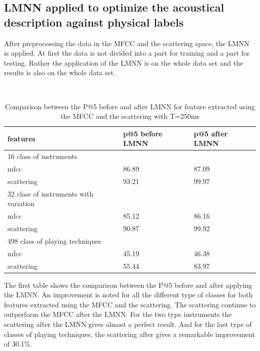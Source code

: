 \documentclass[hidelinks,12pt]{report}
\begin{document}
\subsection{LMNN applied to optimize the acoustical description against physical labels}
After preprocessing the data in the MFCC and the scattering space, the LMNN is applied. At first the data is not divided into a part for training and a part for testing. Rather the application of the LMNN is on the whole data set and the results is also on the whole data set.
\begin{table} [H]
\begin{center} 
\ 
 \setlength{\tabcolsep}{.16667em} 
\begin{tabular}{|l|l|l|} 
\hline
features & p@5 before LMNN & p@5 after LMNN \\ 
\hline 
16 class of instruments \\ 
\hline
mfcc & 86.89& 87.09  \\ 
scattering & 93.21 & 99.97  \\ 

\hline 
32 class of instruments with variation \\ 
\hline
mfcc & 85.12 & 86.16  \\ 
scattering & 90.87 & 99.92  \\ 
\hline 
498 class of playing techniques \\ 
\hline
mfcc &  45.19 & 46.38  \\ 
scattering & 55.44 & 83.97  \\ 
\hline
\end{tabular} 
\end{center} 
\caption{Comparison between the P@5 before and after LMNN for feature extracted using the MFCC and the scattering with T=250ms} 
\label{you} 
\end{table}

The first table shows the comparison between the P@5 before and after applying the LMNN. An improvement is noted for all the different type of classes for both features extracted using the MFCC and the scattering. The scattering continue to outperform the MFCC after the LMNN. For the two type instruments the scattering after the LMNN gives almost a perfect result. And for the last type of classes of playing techniques, the scattering after gives a remarkable improvement of 30.1\%.
\end{document}

